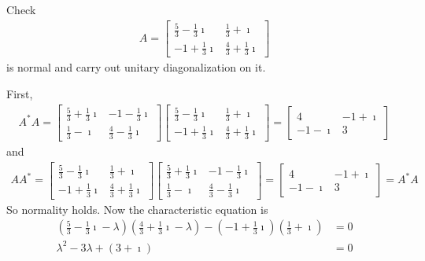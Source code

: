 \begin{exmp}
\label{exmp:unitarydiagnormal}
Check
\begin{align*}
A = 
\begin{bmatrix}
\frac{5}{3}-\frac{1}{3}\imath &\frac{1}{3}+\imath \\ 
-1+\frac{1}{3}\imath & \frac{4}{3}+\frac{1}{3}\imath
\end{bmatrix}
\end{align*}
is normal and carry out unitary diagonalization on it.
\end{exmp}
\begin{solution}
First,
\begin{align*}
A^* A=
\begin{bmatrix}
\frac{5}{3}+\frac{1}{3}\imath & -1-\frac{1}{3}\imath\\ 
\frac{1}{3}-\imath & \frac{4}{3}-\frac{1}{3}\imath
\end{bmatrix}
\begin{bmatrix}
\frac{5}{3}-\frac{1}{3}\imath &\frac{1}{3}+\imath \\ 
-1+\frac{1}{3}\imath & \frac{4}{3}+\frac{1}{3}\imath
\end{bmatrix} =
\begin{bmatrix}
4 & -1+\imath \\
-1-\imath & 3
\end{bmatrix}
\end{align*}
and
\begin{align*}
A A^* =
\begin{bmatrix}
\frac{5}{3}-\frac{1}{3}\imath & \frac{1}{3}+\imath \\ 
-1+\frac{1}{3}\imath & \frac{4}{3}+\frac{1}{3}\imath
\end{bmatrix}
\begin{bmatrix}
\frac{5}{3}+\frac{1}{3}\imath & -1-\frac{1}{3}\imath\\ 
\frac{1}{3}-\imath & \frac{4}{3}-\frac{1}{3}\imath
\end{bmatrix} =
\begin{bmatrix}
4 & -1+\imath \\
-1-\imath & 3
\end{bmatrix} = A^* A
\end{align*}
So normality holds. Now the characteristic equation is
\begin{align*}
(\frac{5}{3}-\frac{1}{3}\imath-\lambda)(\frac{4}{3}+\frac{1}{3}\imath-\lambda) - (-1+\frac{1}{3}\imath)(\frac{1}{3}+\imath) &= 0 \\
\lambda^2 - 3\lambda + (3+\imath) &= 0 
\end{align*}

\end{solution}
